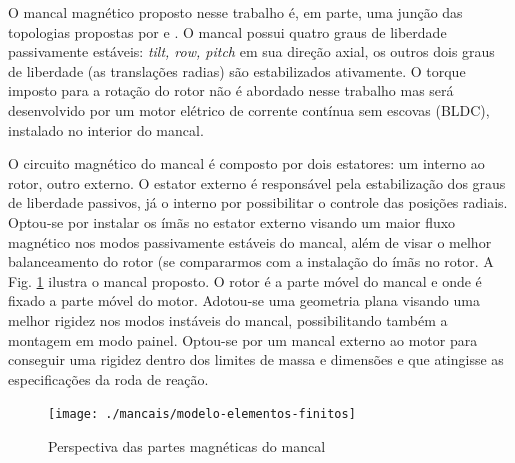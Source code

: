 
O mancal magnético proposto nesse trabalho é, em parte, uma junção das topologias propostas por \citet{Bernus1998} e \citet{Scharfe2001}. O mancal possui quatro graus de liberdade passivamente estáveis: \textit{tilt, row, pitch} em sua direção axial, os outros dois graus de liberdade (as translações radias) são estabilizados ativamente. O torque imposto para a rotação do rotor não é abordado nesse trabalho mas será desenvolvido por um motor elétrico de corrente contínua sem escovas (BLDC), instalado no interior do mancal.


O circuito magnético do mancal é composto por dois estatores: um interno ao rotor, outro externo. O estator externo é responsável pela estabilização dos graus de liberdade passivos, já o interno por possibilitar o controle das posições radiais. Optou-se por instalar os ímãs no estator externo visando um maior fluxo magnético nos modos passivamente estáveis do mancal, além de visar o melhor balanceamento do rotor (se compararmos com a instalação do ímãs no rotor. A Fig. \ref{fig:mancal:topo} ilustra o mancal proposto. O rotor é a parte móvel do mancal e onde é fixado a parte móvel do motor. Adotou-se uma geometria plana visando uma melhor rigidez nos modos instáveis do mancal, possibilitando também a montagem em modo painel. Optou-se por um mancal externo ao motor para conseguir uma rigidez dentro dos limites de massa e dimensões e que atingisse as especificações  da roda de reação. 


\begin{figure}[ht!]
\centering
\texttt{[image: ./mancais/modelo-elementos-finitos]}
\caption[Corte ilustrativo do mancal magnético]{Perspectiva das partes magnéticas do mancal}
\label{fig:mancal:topo}
\end{figure}

